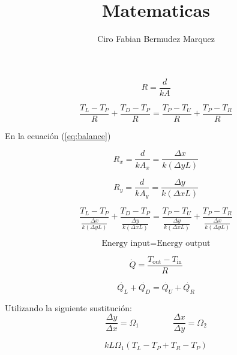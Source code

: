 \documentclass[10pt,a4paper]{article}
\author{Ciro Fabian Bermudez Marquez}
\title{Matematicas}
\begin{document}


\begin{equation}
	R = \frac{d}{kA}
\end{equation}

\begin{equation}
	\frac{T_{L} - T_{P}}{R} + \frac{T_{D}- T_{P}}{R} = \frac{T_{P}- T_{U}}{R} + \frac{T_{P}- T_{R}}{R}
	\label{eq:balance}
\end{equation}

En la ecuación (\ref{eq:balance})

\begin{equation}
	R_{x} = \frac{d}{k A_{x}} = \frac{\Delta x}{k (\Delta y L)} 
\end{equation}

\begin{equation}
	R_{y} = \frac{d}{k A_{y}} = \frac{\Delta y}{k (\Delta x L)} 
\end{equation}



\begin{equation}
	\frac{T_{L} - T_{P}}{\frac{\Delta x}{k (\Delta y L)} } + \frac{T_{D}- T_{P}}{\frac{\Delta y}{k (\Delta x L)} } = \frac{T_{P}- T_{U}}{\frac{\Delta y}{k (\Delta x L)} } + \frac{T_{P}- T_{R}}{\frac{\Delta x}{k (\Delta y L)} }
\end{equation}

\begin{equation}
	\text{Energy input} = \text{Energy output}
\end{equation}

\begin{equation}
	\dot{Q} = \frac{T_{\text{out}} - T_{\text{in}} }{R}
\end{equation}

\begin{equation}
	\dot{Q_{L}} + \dot{Q_{D}} = \dot{Q_{U}} + \dot{Q_{R}}
\end{equation}

Utilizando la siguiente sustitución:
\begin{equation}
	 \frac{\Delta y}{\Delta x}  = \Omega_{1} \qquad \qquad  \frac{\Delta x}{\Delta y}  = \Omega_{2}
\end{equation}

\begin{equation}
	k L \Omega_{1} \left(  T_{L} - T_{P} + T_{R} - T_{P} \right)
\end{equation}
\end{document}
